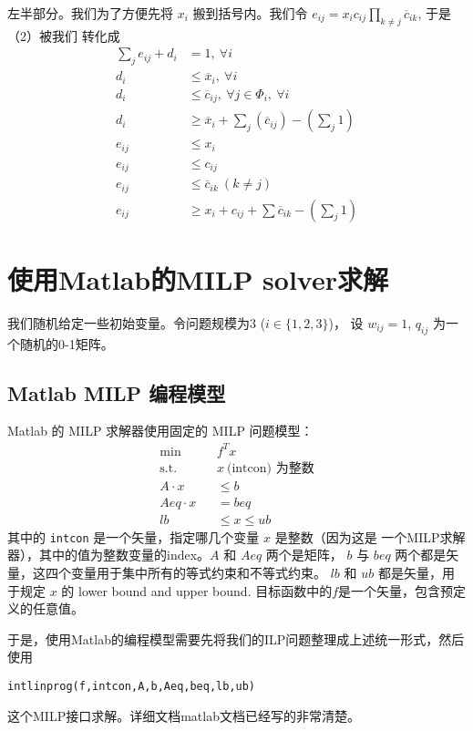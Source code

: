 \documentclass[onecolumn,times]{article}
\begin{document}
\begin{CJK}{UTF8}{gkai}
左半部分。我们为了方便先将 $x_i$ 搬到括号内。我们令
$e_{ij} = x_i c_{ij} \prod_{k\neq j} \overline{c}_{ik}$, 于是（2）被我们
转化成
\begin{align}
	\sum_j e_{ij} + d_i &= 1,~ \forall i\\
	d_i &\leq \overline{x}_i,~\forall i\\
	d_i &\leq \overline{c}_{ij},~\forall j\in \Phi_i,~\forall i\\
	d_i &\geq \overline{x}_i + \sum_j(\overline{c}_{ij}) - (\sum_j 1)\\
	e_{ij} &\leq x_i\\
	e_{ij} &\leq c_{ij}\\
	e_{ij} &\leq \overline{c}_{ik}~(k\neq j)\\
	e_{ij} &\geq x_i + c_{ij} + \sum \overline{c}_{ik} - (\sum_j 1)
\end{align}

\section{使用Matlab的MILP solver求解}

我们随机给定一些初始变量。令问题规模为$3$ ($i\in \{1,2,3\}$)，
设 $w_{ij}=1$, $q_{ij}$ 为一个随机的0-1矩阵。

\subsection{Matlab MILP 编程模型}

Matlab 的 MILP 求解器使用固定的 MILP 问题模型：
\begin{align}
	\min\qquad & f^T x\\
	\text{s.t.}\qquad & x~\text{(intcon) 为整数}\\
	A\cdot x &\leq b\\
	Aeq\cdot x &= beq\\
	lb &\leq x \leq ub
\end{align}
其中的 \verb|intcon| 是一个矢量，指定哪几个变量 $x$ 是整数（因为这是
一个MILP求解器），其中的值为整数变量的index。$A$ 和 $Aeq$ 两个是矩阵，
$b$ 与 $beq$ 两个都是矢量，这四个变量用于集中所有的等式约束和不等式约束。
$lb$ 和 $ub$ 都是矢量，用于规定 $x$ 的 lower bound and upper bound.
目标函数中的$f$是一个矢量，包含预定义的任意值。

于是，使用Matlab的编程模型需要先将我们的ILP问题整理成上述统一形式，然后
使用
\begin{center}
\verb|intlinprog(f,intcon,A,b,Aeq,beq,lb,ub)|
\end{center}
这个MILP接口求解。详细文档matlab文档已经写的非常清楚。


\end{CJK}
\end{document}
